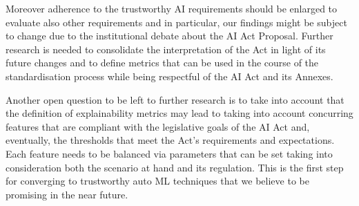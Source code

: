 \documentclass[sigconf]{acmart}
\begin{document}
Moreover adherence to the trustworthy AI requirements should be enlarged to evaluate also other requirements and in particular, our findings might be subject to change due to the institutional debate about the AI Act Proposal. Further research is needed to consolidate the interpretation of the Act in light of its future changes and to define metrics that can be used in the course of the standardisation process while being respectful of the AI Act and its Annexes.

Another open question to be left to further research is to take into account that the definition of explainability metrics may lead to taking into account concurring features that are compliant with the legislative goals of the AI Act and, eventually, the thresholds that meet the Act’s requirements and expectations. Each feature needs to be balanced via parameters that can be set taking into consideration both the scenario at hand and its regulation. This is the first step for converging to trustworthy auto ML techniques that we believe to be promising in the near future.




\end{document}
